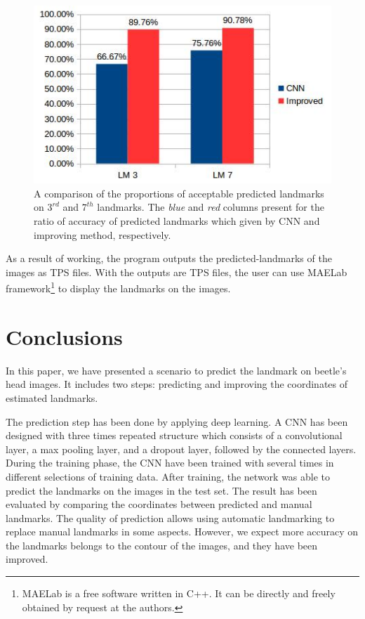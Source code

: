 \documentclass[10pt]{article}
\begin{document}
\begin{figure}[htbp]
	\centerline{\includegraphics[scale=0.8]{images/chart_cnn_improving}}
	\caption{A comparison of the proportions of acceptable predicted landmarks on $3^{rd}$ and $7^{th}$ landmarks. The \textit{blue} and \textit{red} columns present for the ratio of accuracy of predicted landmarks which given by CNN and improving method, respectively.}
	\label{figchart2}
\end{figure}

As a result of working, the program outputs the
predicted-landmarks of the images as TPS files. With the outputs are TPS files,
the user can use MAELab framework\footnote{MAELab is a free software written in C++. It can be directly and freely
obtained by request at the authors.} to display the
landmarks on the images.
\section{Conclusions}
In this paper, we have presented a scenario to predict the landmark on beetle's head images. It includes two steps: predicting and improving the coordinates of estimated landmarks. 

The prediction step has been done by applying deep learning. A CNN has been designed with three times repeated structure which consists of a convolutional layer, a max pooling layer, and a dropout layer, followed by the connected layers. During the training phase, the CNN have been trained with several times in different selections of training data. After training, the network was able to predict the landmarks on the images in the test set. The result has been evaluated by comparing the coordinates between predicted and manual landmarks. The quality of prediction allows using automatic
landmarking to replace manual landmarks in some aspects. However, we expect more accuracy on the landmarks belongs to the contour of the images, and they have been improved.
\end{document}
